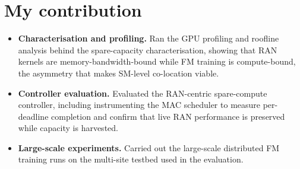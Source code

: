 \documentclass[letterpaper,11pt]{article}
\begin{document}
\vspace{12pt}

\section*{My contribution}

\begin{itemize}[leftmargin=*]
  \item\small{\textbf{Characterisation and profiling.} Ran the GPU profiling and roofline analysis
    behind the spare-capacity characterisation, showing that RAN kernels are memory-bandwidth-bound
    while FM training is compute-bound, the asymmetry that makes SM-level co-location viable.
    \vspace{-3pt}}
  \item\small{\textbf{Controller evaluation.} Evaluated the RAN-centric spare-compute controller,
    including instrumenting the MAC scheduler to measure per-deadline completion and confirm that
    live RAN performance is preserved while capacity is harvested. \vspace{-3pt}}
  \item\small{\textbf{Large-scale experiments.} Carried out the large-scale distributed FM training
    runs on the multi-site testbed used in the evaluation. \vspace{-3pt}}
\end{itemize}
\end{document}
